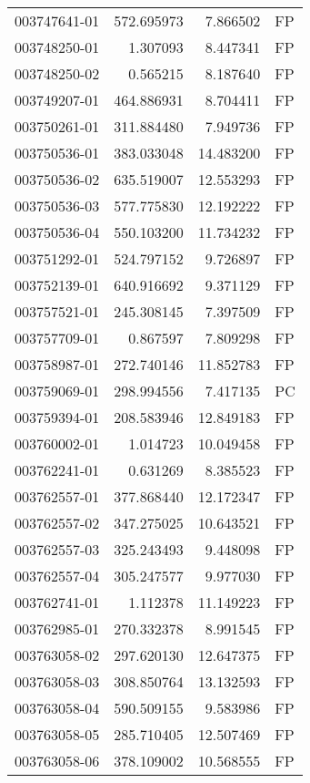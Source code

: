 \begin{tabular}{lrrl}
003747641-01 &  572.695973 &     7.866502 &   FP \\
003748250-01 &    1.307093 &     8.447341 &   FP \\
003748250-02 &    0.565215 &     8.187640 &   FP \\
003749207-01 &  464.886931 &     8.704411 &   FP \\
003750261-01 &  311.884480 &     7.949736 &   FP \\
003750536-01 &  383.033048 &    14.483200 &   FP \\
003750536-02 &  635.519007 &    12.553293 &   FP \\
003750536-03 &  577.775830 &    12.192222 &   FP \\
003750536-04 &  550.103200 &    11.734232 &   FP \\
003751292-01 &  524.797152 &     9.726897 &   FP \\
003752139-01 &  640.916692 &     9.371129 &   FP \\
003757521-01 &  245.308145 &     7.397509 &   FP \\
003757709-01 &    0.867597 &     7.809298 &   FP \\
003758987-01 &  272.740146 &    11.852783 &   FP \\
003759069-01 &  298.994556 &     7.417135 &   PC \\
003759394-01 &  208.583946 &    12.849183 &   FP \\
003760002-01 &    1.014723 &    10.049458 &   FP \\
003762241-01 &    0.631269 &     8.385523 &   FP \\
003762557-01 &  377.868440 &    12.172347 &   FP \\
003762557-02 &  347.275025 &    10.643521 &   FP \\
003762557-03 &  325.243493 &     9.448098 &   FP \\
003762557-04 &  305.247577 &     9.977030 &   FP \\
003762741-01 &    1.112378 &    11.149223 &   FP \\
003762985-01 &  270.332378 &     8.991545 &   FP \\
003763058-02 &  297.620130 &    12.647375 &   FP \\
003763058-03 &  308.850764 &    13.132593 &   FP \\
003763058-04 &  590.509155 &     9.583986 &   FP \\
003763058-05 &  285.710405 &    12.507469 &   FP \\
003763058-06 &  378.109002 &    10.568555 &   FP \\

\end{tabular}
